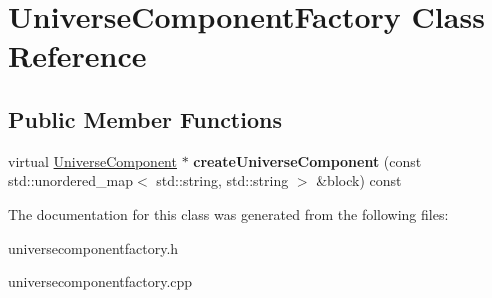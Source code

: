 \hypertarget{classUniverseComponentFactory}{}\section{Universe\+Component\+Factory Class Reference}
\label{classUniverseComponentFactory}
\subsection*{Public Member Functions}
\begin{DoxyCompactItemize}
\item 
virtual \hyperlink{classUniverseComponent}{Universe\+Component} $\ast$ {\bfseries create\+Universe\+Component} (const std\+::unordered\+\_\+map$<$ std\+::string, std\+::string $>$ \&block) const\hypertarget{classUniverseComponentFactory_a79ce139450c104c1c01aeca0ddba27b0}{}\label{classUniverseComponentFactory_a79ce139450c104c1c01aeca0ddba27b0}

\end{DoxyCompactItemize}


The documentation for this class was generated from the following files\+:\begin{DoxyCompactItemize}
\item 
universecomponentfactory.\+h\item 
universecomponentfactory.\+cpp\end{DoxyCompactItemize}
